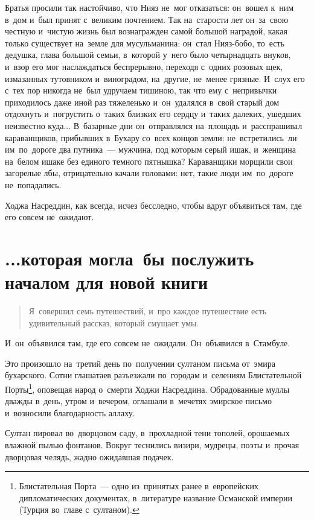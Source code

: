 \documentclass[12pt,a4paper]{book}
\begin{document}
Братья просили так настойчиво, что Нияз не~мог отказаться: он~вошел к~ним в~дом и~был принят с~великим почтением. Так на~старости лет он~за~свою честную и~чистую жизнь был вознагражден самой большой наградой, какая только существует на~земле для мусульманина: он~стал Нияз-бобо, то~есть дедушка, глава большой семьи, в~которой у~него было четырнадцать внуков, и~взор его мог наслаждаться беспрерывно, переходя с~одних розовых щек, измазанных тутовником и~виноградом, на~другие, не~менее грязные. И~слух его с~тех пор никогда не~был удручаем тишиною, так что ему с~непривычки приходилось даже иной раз тяжеленько и~он~удалялся в~свой старый дом отдохнуть и~погрустить о~таких близких его сердцу и~таких далеких, ушедших неизвестно куда... В~базарные дни он~отправлялся на~площадь и~расспрашивал караванщиков, прибывших в~Бухару со~всех концов земли: не~встретились~ли им~по~дороге два путника~— мужчина, под которым серый ишак, и~женщина на~белом ишаке без единого темного пятнышка? Караванщики морщили свои загорелые лбы, отрицательно качали головами: нет, такие люди им~по~дороге не~попадались.

Ходжа Насреддин, как всегда, исчез бесследно, чтобы вдруг объявиться там, где его совсем не~ожидают.


\chapter{...которая могла~бы послужить началом для новой книги}

\begin{quote}
Я~совершил семь путешествий, и~про каждое путешествие есть удивительный рассказ, который смущает умы.
\end{quote}

И~он~объявился там, где его совсем не~ожидали. Он~объявился в~Стамбуле.

Это произошло на~третий день по~получении султаном письма от~эмира бухарского. Сотни глашатаев разъезжали по~городам и~селениям Блистательной Порты\footnote{Блистательная Порта~— одно из~принятых ранее в~европейских дипломатических документах, в~литературе название Османской империи (Турция во~главе с~султаном).}, оповещая народ о~смерти Ходжи Насреддина. Обрадованные муллы дважды в~день, утром и~вечером, оглашали в~мечетях эмирское письмо и~возносили благодарность аллаху.

Султан пировал во~дворцовом саду, в~прохладной тени тополей, орошаемых влажной пылью фонтанов. Вокруг теснились визири, мудрецы, поэты и~прочая дворцовая челядь, жадно ожидавшая подачек.
\end{document}
